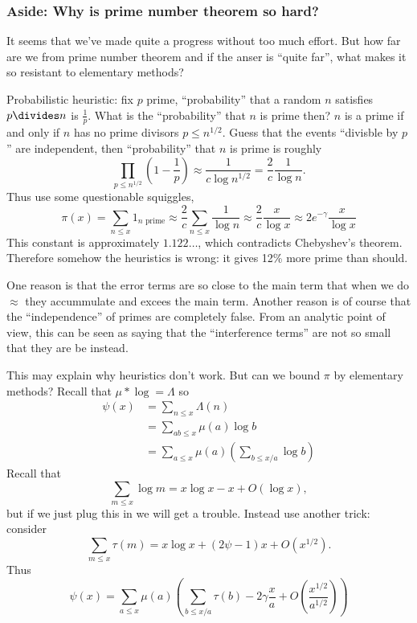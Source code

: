 \documentclass[a4paper]{article}
\begin{document}
\subsubsection{Aside: Why is prime number theorem so hard?}

It seems that we've made quite a progress without too much effort. But how far are we from prime number theorem and if the anser is ``quite far'', what makes it so resistant to elementary methods?

Probabilistic heuristic: fix \(p\) prime, ``probability'' that a random \(n\) satisfies \(p \divides n\) is \(\frac{1}{p}\). What is the ``probability'' that \(n\) is prime then? \(n\) is a prime if and only if \(n\) has no prime divisors \(p \leq n^{1/2}\). Guess that the events ``divisble by \(p\)'' are independent, then ``probability'' that \(n\) is prime is roughly
\[
  \prod_{p \leq n^{1/2}} \left( 1 - \frac{1}{p} \right)
  \approx \frac{1}{c \log n^{1/2}}
  = \frac{2}{c} \frac{1}{\log n}.
\]
Thus use some questionable squiggles,
\[
  \pi(x)
  = \sum_{n \leq x} 1_{n \text{ prime}}
  \approx \frac{2}{c} \sum_{n \leq x} \frac{1}{\log n}
  \approx \frac{2}{c} \frac{x}{\log x}
  \approx 2e^{-\gamma} \frac{x}{\log x}
\]
This constant is approximately \(1.122\dots\), which contradicts Chebyshev's theorem. Therefore somehow the heuristics is wrong: it gives 12\% more prime than should.

One reason is that the error terms are so close to the main term that when we do \(\approx\) they accummulate and excees the main term. Another reason is of course that the ``independence'' of primes are completely false. From an analytic point of view, this can be seen as saying that the ``interference terms'' are not so small that they are be instead.

This may explain why heuristics don't work. But can we bound \(\pi\) by elementary methods? Recall that \(\mu * \log = \Lambda\) so
\begin{align*}
  \psi(x)
  &= \sum_{n \leq x} \Lambda(n) \\
  &= \sum_{ab \leq x} \mu(a) \log b \\
  &= \sum_{a \leq x} \mu(a) \left( \sum_{b \leq x/a} \log b \right)
\end{align*}
Recall that
\[
  \sum_{m \leq x} \log m = x \log x - x + O(\log x),
\]
but if we just plug this in we will get a trouble. Instead use another trick: consider
\[
  \sum_{m \leq x} \tau(m) = x \log x + (2 \psi - 1) x + O(x^{1/2}).
\]
Thus
\[
  \psi(x)
  = \sum_{a \leq x} \mu(a) \left( \sum_{b \leq x/a} \tau(b) - 2\gamma \frac{x}{a} + O(\frac{x^{1/2}}{a^{1/2}}) \right)
\]
\end{document}
